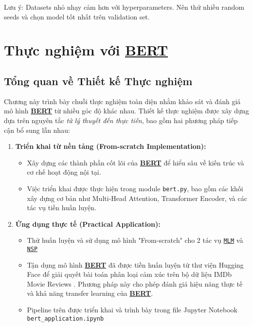 Lưu ý: Datasets nhỏ nhạy cảm hơn với hyperparameters. Nên thử nhiều random seeds và chọn model tốt nhất trên validation set.


\section{Thực nghiệm với \hyperref[acro:bert]{\textbf{BERT}}}
\label{sec:thuc_nghiem_bert}

\subsection{Tổng quan về Thiết kế Thực nghiệm}
\label{ssec:tong_quan_thiet_ke_thuc_nghiem}

Chương này trình bày chuỗi thực nghiệm toàn diện nhằm khảo sát và đánh giá mô hình \hyperref[acro:bert]{\textbf{BERT}} từ nhiều góc độ khác nhau. Thiết kế thực nghiệm được xây dựng dựa trên nguyên tắc \textit{từ lý thuyết đến thực tiễn}, bao gồm hai phương pháp tiếp cận bổ sung lẫn nhau:

\begin{enumerate}
    \item \textbf{Triển khai từ nền tảng (From-scratch Implementation):} 
    \begin{itemize}
        \item Xây dựng các thành phần cốt lõi của \hyperref[acro:bert]{\textbf{BERT}} để hiểu sâu về kiến trúc và cơ chế hoạt động nội tại. 
        \item Việc triển khai được thực hiện trong module \texttt{bert.py}, bao gồm các khối xây dựng cơ bản như Multi-Head Attention, Transformer Encoder, và các tác vụ tiền huấn luyện.
    \end{itemize}
    
    \item \textbf{Ứng dụng thực tế (Practical Application):} 
    \begin{itemize}
        \item Thử huấn luyện và sử dụng mô hình "From-scratch" cho 2 tác vụ \hyperref[acro:mlm]{\texttt{MLM}} và \hyperref[acro:nsp]{\texttt{NSP}}
        \item Tận dụng mô hình \hyperref[acro:bert]{\textbf{BERT}} đã được tiền huấn luyện từ thư viện Hugging Face \cite{wolf2019huggingface} để giải quyết bài toán phân loại cảm xúc trên bộ dữ liệu IMDb Movie Reviews \cite{maas2011learning}. Phương pháp này cho phép đánh giá hiệu năng thực tế và khả năng transfer learning của \hyperref[acro:bert]{\textbf{BERT}}.
        \item Pipeline trên được triển khai và trình bày trong file Jupyter Notebook \texttt{bert\_application.ipynb}
    \end{itemize}
\end{enumerate}

